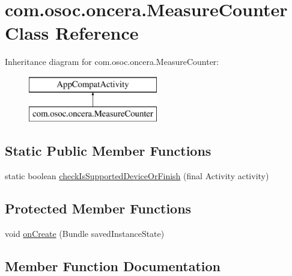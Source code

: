 \hypertarget{classcom_1_1osoc_1_1oncera_1_1_measure_counter}{}\section{com.\+osoc.\+oncera.\+Measure\+Counter Class Reference}
\label{classcom_1_1osoc_1_1oncera_1_1_measure_counter}
Inheritance diagram for com.\+osoc.\+oncera.\+Measure\+Counter\+:\begin{figure}[H]
\begin{center}
\leavevmode
\includegraphics[height=2.000000cm]{classcom_1_1osoc_1_1oncera_1_1_measure_counter}
\end{center}
\end{figure}
\subsection*{Static Public Member Functions}
\begin{DoxyCompactItemize}
\item 
static boolean \mbox{\hyperlink{classcom_1_1osoc_1_1oncera_1_1_measure_counter_a082bd7a5f3f6b04f07c38f8ccd8e6cdc}{check\+Is\+Supported\+Device\+Or\+Finish}} (final Activity activity)
\end{DoxyCompactItemize}
\subsection*{Protected Member Functions}
\begin{DoxyCompactItemize}
\item 
void \mbox{\hyperlink{classcom_1_1osoc_1_1oncera_1_1_measure_counter_a4c5ab3247870cd93695e6ca99c1c2a19}{on\+Create}} (Bundle saved\+Instance\+State)
\end{DoxyCompactItemize}


\subsection{Member Function Documentation}
\mbox{\label{classcom_1_1osoc_1_1oncera_1_1_measure_counter_a082bd7a5f3f6b04f07c38f8ccd8e6cdc}} 

